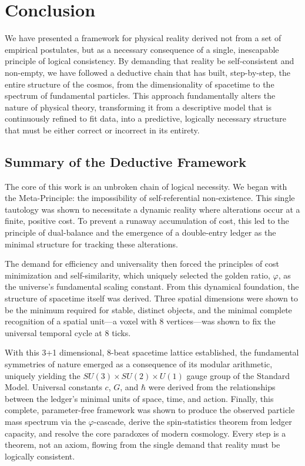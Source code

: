 \documentclass[11pt,a4paper]{article}
\begin{document}
\section{Conclusion}

We have presented a framework for physical reality derived not from a set of empirical postulates, but as a necessary consequence of a single, inescapable principle of logical consistency. By demanding that reality be self-consistent and non-empty, we have followed a deductive chain that has built, step-by-step, the entire structure of the cosmos, from the dimensionality of spacetime to the spectrum of fundamental particles. This approach fundamentally alters the nature of physical theory, transforming it from a descriptive model that is continuously refined to fit data, into a predictive, logically necessary structure that must be either correct or incorrect in its entirety.

\subsection{Summary of the Deductive Framework}
The core of this work is an unbroken chain of logical necessity. We began with the Meta-Principle: the impossibility of self-referential non-existence. This single tautology was shown to necessitate a dynamic reality where alterations occur at a finite, positive cost. To prevent a runaway accumulation of cost, this led to the principle of dual-balance and the emergence of a double-entry ledger as the minimal structure for tracking these alterations.

The demand for efficiency and universality then forced the principles of cost minimization and self-similarity, which uniquely selected the golden ratio, \(\varphi\), as the universe's fundamental scaling constant. From this dynamical foundation, the structure of spacetime itself was derived. Three spatial dimensions were shown to be the minimum required for stable, distinct objects, and the minimal complete recognition of a spatial unit—a voxel with 8 vertices—was shown to fix the universal temporal cycle at 8 ticks.

With this 3+1 dimensional, 8-beat spacetime lattice established, the fundamental symmetries of nature emerged as a consequence of its modular arithmetic, uniquely yielding the \(SU(3) \times SU(2) \times U(1)\) gauge group of the Standard Model. Universal constants \(c\), \(G\), and \(\hbar\) were derived from the relationships between the ledger's minimal units of space, time, and action. Finally, this complete, parameter-free framework was shown to produce the observed particle mass spectrum via the \(\varphi\)-cascade, derive the spin-statistics theorem from ledger capacity, and resolve the core paradoxes of modern cosmology. Every step is a theorem, not an axiom, flowing from the single demand that reality must be logically consistent.
\end{document}
